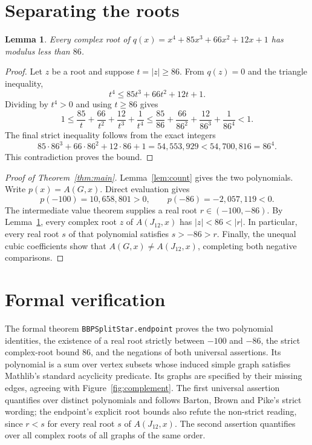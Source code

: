 \documentclass[11pt]{article}
\newtheorem{lemma}[theorem]{Lemma}
\begin{document}
\section{Separating the roots}
\begin{lemma}\label{lem:disk}
Every complex root of $q(x)=x^4+85x^3+66x^2+12x+1$ has modulus less than $86$.
\end{lemma}
\begin{proof}
Let $z$ be a root and suppose $t=|z|\geq86$. From $q(z)=0$ and the triangle inequality,
\[
 t^4\leq85t^3+66t^2+12t+1.
\]
Dividing by $t^4>0$ and using $t\geq86$ gives
\[
 1\leq\frac{85}{t}+\frac{66}{t^2}+\frac{12}{t^3}+\frac1{t^4}
 \leq\frac{85}{86}+\frac{66}{86^2}+\frac{12}{86^3}+\frac1{86^4}<1.
\]
The final strict inequality follows from the exact integers
\[
 85\cdot86^3+66\cdot86^2+12\cdot86+1
 =54{,}553{,}929<54{,}700{,}816=86^4.
\]
This contradiction proves the bound.
\end{proof}

\begin{proof}[Proof of Theorem~\ref{thm:main}]
Lemma~\ref{lem:count} gives the two polynomials. Write $p(x)=A(G,x)$. Direct evaluation gives
\[
 p(-100)=10{,}658{,}801>0,\qquad p(-86)=-2{,}057{,}119<0.
\]
The intermediate value theorem supplies a real root $r\in(-100,-86)$. By Lemma~\ref{lem:disk}, every complex root $z$ of $A(J_{12},x)$ has $|z|<86<|r|$. In particular, every real root $s$ of that polynomial satisfies $s>-86>r$. Finally, the unequal cubic coefficients show that $A(G,x)\neq A(J_{12},x)$, completing both negative comparisons.
\end{proof}

\section{Formal verification}
The formal theorem \texttt{BBPSplitStar.endpoint} proves the two polynomial identities, the existence of a real root strictly between $-100$ and $-86$, the strict complex-root bound $86$, and the negations of both universal assertions. Its polynomial is a sum over vertex subsets whose induced simple graph satisfies Mathlib's standard acyclicity predicate. Its graphs are specified by their missing edges, agreeing with Figure~\ref{fig:complement}. The first universal assertion quantifies over distinct polynomials and follows Barton, Brown and Pike's strict wording; the endpoint's explicit root bounds also refute the non-strict reading, since $r<s$ for every real root $s$ of $A(J_{12},x)$. The second assertion quantifies over all complex roots of all graphs of the same order.
\end{document}

